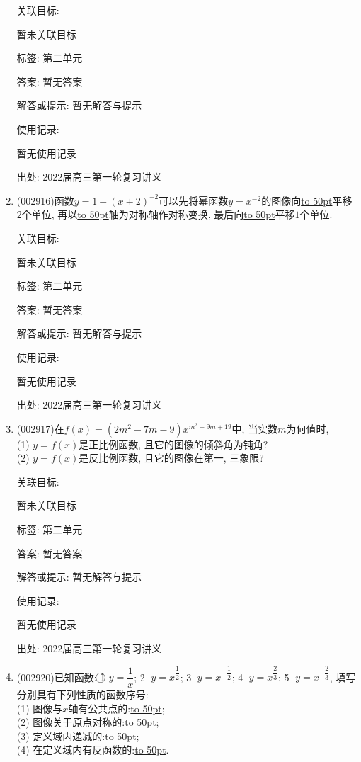 \documentclass[10pt,a4paper]{article}
\newcommand{\blank}[1]{\underline{\hbox to #1pt{}}}
\begin{document}
\begin{enumerate}[1.]
关联目标:

暂未关联目标



标签: 第二单元

答案: 暂无答案

解答或提示: 暂无解答与提示

使用记录:

暂无使用记录


出处: 2022届高三第一轮复习讲义
\item { (002916)}函数$y=1-(x+2)^{-2}$可以先将幂函数$y=x^{-2}$的图像向\blank{50}平移$2$个单位, 再以\blank{50}轴为对称轴作对称变换, 最后向\blank{50}平移$1$个单位.


关联目标:

暂未关联目标



标签: 第二单元

答案: 暂无答案

解答或提示: 暂无解答与提示

使用记录:

暂无使用记录


出处: 2022届高三第一轮复习讲义
\item { (002917)}在$f(x)=(2m^2-7m-9)x^{m^2-9m+19}$中, 当实数$m$为何值时,\\
(1) $y=f(x)$是正比例函数, 且它的图像的倾斜角为钝角?\\
(2) $y=f(x)$是反比例函数, 且它的图像在第一, 三象限?


关联目标:

暂未关联目标



标签: 第二单元

答案: 暂无答案

解答或提示: 暂无解答与提示

使用记录:

暂无使用记录


出处: 2022届高三第一轮复习讲义
\item { (002920)}已知函数: \textcircled{1} $y=\dfrac 1x$; \textcircled{2} $y=x^{\dfrac 12}$; \textcircled{3} $y=x^{-\dfrac 12}$; \textcircled{4} $y={x^{\dfrac 23}}$; \textcircled{5} $y=x^{-\dfrac 23}$, 填写分别具有下列性质的函数序号:\\ 
(1) 图像与$x$轴有公共点的:\blank{50};\\
(2) 图像关于原点对称的:\blank{50};\\
(3) 定义域内递减的:\blank{50};\\
(4) 在定义域内有反函数的:\blank{50}.



\end{enumerate}
\end{document}

